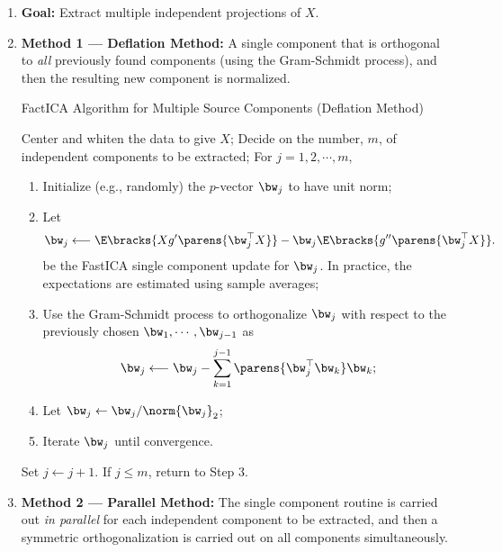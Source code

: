 \documentclass[12pt]{article}
\begin{document}
\begin{enumerate}[label=\textbf{\arabic*.}]

	\item \textbf{Goal:} Extract multiple independent projections of $X$. 
	
	\item \textbf{Method 1 --- Deflation Method:} A single component that is orthogonal to \emph{all} previously found components (using the Gram-Schmidt process), and then the resulting new component is normalized. 
	
	\begin{minipage}{\linewidth}
		\begin{algorithm}[H]
		\caption{FactICA Algorithm for Multiple Source Components (Deflation Method)}\label{algo-fastica-multiple-deflation}
		\begin{algorithmic}[1]
		\STATE Center and whiten the data to give $X$; 
		\STATE Decide on the number, $m$, of independent components to be extracted; 
		\STATE For $j = 1, 2, \cdots, m$, 
		\begin{enumerate}
			\item Initialize (e.g., randomly) the $p$-vector $\bw_j$ to have unit norm; 
			\item Let 
			\begin{align*}
				\bw_j \longleftarrow \E \bracks{X g' \parens{\bw_{j}^\top X}} - \bw_{j} \E \bracks{ g'' \parens{\bw_{j}^\top X}}. 
			\end{align*}
			be the FastICA single component update for $\bw_j$. In practice, the expectations are estimated using sample averages; 
			\item Use the Gram-Schmidt process to orthogonalize $\bw_j$ with respect to the previously chosen $\bw_1, \cdots, \bw_{j-1}$ as 
			\begin{align*}
				\bw_j \longleftarrow \bw_j - \sum_{k=1}^{j-1} \parens{\bw_j^\top \bw_k} \bw_k; 
			\end{align*}
			\item Let $\bw_j \leftarrow \bw_j / \norm{\bw_j}_2$; 
			\item Iterate $\bw_j$ until convergence. 
		\end{enumerate}
		
		\STATE Set $j \leftarrow j+1$. If $j \le m$, return to Step 3. 
		\end{algorithmic}
		\end{algorithm}
	\end{minipage}
	
	\item \textbf{Method 2 --- Parallel Method:} The single component routine is carried out \emph{in parallel} for each independent component to be extracted, and then a symmetric orthogonalization is carried out on all components simultaneously. 
	

\end{enumerate}
\end{document}
